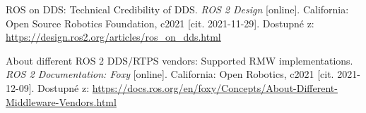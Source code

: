 \begin{thebibliography}{99}
ROS on DDS: Technical Credibility of DDS. \textit{ROS 2 Design} [online]. California: Open Source Robotics Foundation, c2021 [cit. 2021-11-29]. Dostupné z: \url{https://design.ros2.org/articles/ros\_on\_dds.html}


About different ROS 2 DDS/RTPS vendors: Supported RMW implementations. \textit{ROS 2 Documentation: Foxy} [online]. California: Open Robotics, c2021 [cit. 2021-12-09]. Dostupné z: \url{https://docs.ros.org/en/foxy/Concepts/About-Different-Middleware-Vendors.html}









\end{thebibliography}
